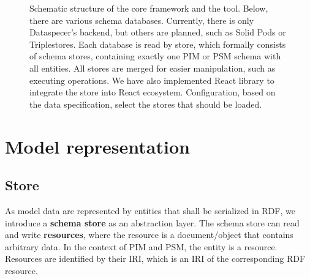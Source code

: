{\begin{figure}
    \caption{Schematic structure of the core framework and the tool. Below, there are various schema databases. Currently, there is only Dataspecer's backend, but others are planned, such as Solid Pods or Triplestores. Each database is read by store, which formally consists of schema stores, containing exactly one PIM or PSM schema with all entities. All stores are merged for easier manipulation, such as executing operations. We have also implemented React library to integrate the store into React ecosystem. Configuration, based on the data specification, select the stores that should be loaded.  } %
\end{figure}
\clearpage
}

\section{Model representation}

\subsection{Store}

As model data are represented by entities that shall be serialized in RDF, we introduce a \textbf{schema store} as an abstraction layer. The schema store can read and write \textbf{resources}, where the resource is a document/object that contains arbitrary data. In the context of PIM and PSM, the entity is a resource. Resources are identified by their IRI, which is an IRI of the corresponding RDF resource.

